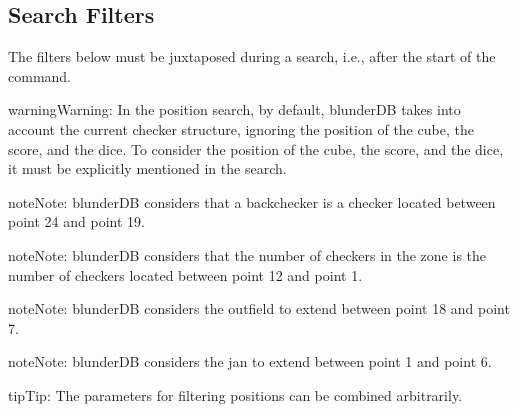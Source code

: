 \documentclass[letterpaper,10pt,english]{sphinxmanual}
\begin{document}
\subsection{Search Filters}
\label{\detokenize{cmd_mode:filtres-de-recherche}}\label{\detokenize{cmd_mode:cmd-filter}}
\sphinxAtStartPar
The filters below must be juxtaposed during a search, i.e., after the start of the  command.

\label{\detokenize{cmd_mode:cmd-filter-pos}}
\begin{sphinxadmonition}{warning}{Warning:}
\sphinxAtStartPar
In the position search, by default, blunderDB takes into account the current checker structure, ignoring the position of the cube, the score, and the dice. To consider the position of the cube, the score, and the dice, it must be explicitly mentioned in the search.
\end{sphinxadmonition}

\begin{sphinxadmonition}{note}{Note:}
\sphinxAtStartPar
blunderDB considers that a backchecker is a checker located between point 24 and point 19.
\end{sphinxadmonition}

\begin{sphinxadmonition}{note}{Note:}
\sphinxAtStartPar
blunderDB considers that the number of checkers in the zone is the number of checkers located between point 12 and point 1.
\end{sphinxadmonition}

\begin{sphinxadmonition}{note}{Note:}
\sphinxAtStartPar
blunderDB considers the outfield to extend between point 18 and point 7.
\end{sphinxadmonition}

\begin{sphinxadmonition}{note}{Note:}
\sphinxAtStartPar
blunderDB considers the jan to extend between point 1 and point 6.
\end{sphinxadmonition}

\begin{sphinxadmonition}{tip}{Tip:}
\sphinxAtStartPar
The parameters for filtering positions can be combined arbitrarily.
\end{sphinxadmonition}
\end{document}
